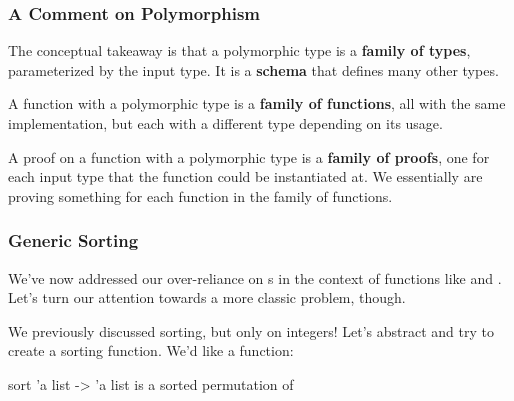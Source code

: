 \documentclass[aspectratio=169, handout]{beamer}
\begin{document}
\begin{frame}[fragile]
  \frametitle{A Comment on Polymorphism}

  \tgs

  The conceptual takeaway is that a polymorphic type is a \textbf{family of types},
  parameterized by the input type. It is a \textbf{schema} that defines many other
  types.

  \pause
  \vspace{\fill}

  A function with a polymorphic type is a \textbf{family of functions}, all with
  the same implementation, but each with a different type depending on its usage.

  \pause
  \vspace{\fill}

  A proof on a function with a polymorphic type is a \textbf{family of proofs},
  one for each input type that the function could be instantiated at. We essentially
  are proving something for each function in the family of functions.
\end{frame}



\begin{frame}[fragile]
  \frametitle{Generic Sorting}

  We've now addressed our over-reliance on s in the context of functions like
   and . Let's turn our attention towards a more classic problem,
  though.

  \pause
  \vspace{\fill}
  
  We previously discussed sorting, but only on integers! Let's abstract and try to create a
   sorting function. We'd like a function: 

  \pause
  \vspace{\fill}

  \spec
    {sort}
    {'a list -> 'a list}
    {}
    { is a sorted permutation of }

\end{frame}
\end{document}

